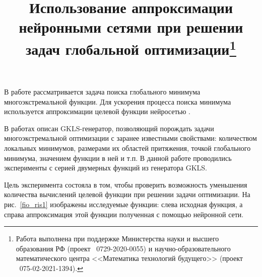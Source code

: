 \documentclass[11pt, oneside, a4paper]{article}
\begin{document}
\setcounter{page}{1}



\title{Использование аппроксимации нейронными сетями при решении задач глобальной оптимизации\footnote{Работа выполнена при поддержке Министерства науки и высшего образования РФ (проект \textnumero~0729-2020-0055) и научно-образовательного математического центра <<Математика технологий будущего>> (проект \textnumero~075-02-2021-1394).}}





В работе рассматривается задача поиска глобального минимума многоэкстремальной функции. Для ускорения процесса поиска минимума используется аппроксимации целевой функции нейросетью \cite{fio_bib1,fio_bib2,fio_bib3,fio_bib4}.


В работах \cite{fio_bib5,fio_bib6} описан GKLS-генератор, позволяющий порождать задачи многоэкстремальной оптимизации с заранее известными свойствами: количеством локальных минимумов, размерами их областей притяжения, точкой глобального минимума, значением функции в ней и т.п. В данной работе проводились эксперименты с серией двумерных функций из генератора GKLS.


Цель эксперимента состояла в том, чтобы проверить возможность уменьшения количества вычислений целевой функции при решении задачи оптимизации. На рис.~\ref{fio_ris1} изображены исследуемые функции: слева исходная функция, а справа аппроксимация этой функции полученная с помощью нейронной сети. 
\end{document}
